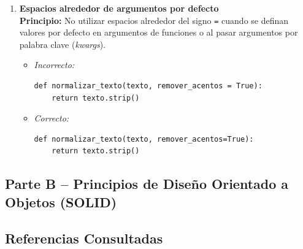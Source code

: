 \documentclass[12pt, letterpaper]{article}
\begin{document}
\begin{enumerate}
    \item \textbf{Espacios alrededor de argumentos por defecto} \\
    \textbf{Principio:} No utilizar espacios alrededor del signo \texttt{=} cuando se definan valores por defecto en argumentos de funciones o al pasar argumentos por palabra clave (\textit{kwargs}).
    \begin{itemize}
        \item \textit{Incorrecto:}
\begin{verbatim}
def normalizar_texto(texto, remover_acentos = True):
    return texto.strip()
\end{verbatim}
        \item \textit{Correcto:}
\begin{verbatim}
def normalizar_texto(texto, remover_acentos=True):
    return texto.strip()
\end{verbatim}
    \end{itemize}
\end{enumerate}

\newpage
\subsection{Parte B -- Principios de Diseño Orientado a Objetos (SOLID)}


\subsection{Referencias Consultadas}
\end{document}
